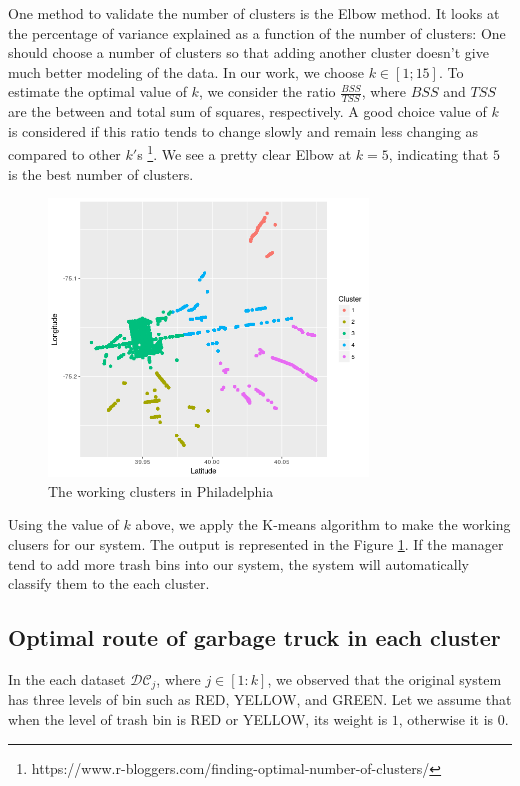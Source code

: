 \documentclass[conference,compsoc]{IEEEtran}
\begin{document}
 One method to validate the number of clusters is the Elbow method. It looks at the percentage of variance explained as a function of the number of clusters: One should choose a number of clusters so that adding another cluster doesn’t give much better modeling of the data. In our work, we choose $k \in [1;15]$. To estimate the optimal value of $k$, we consider the ratio $\frac{BSS}{TSS}$, where $BSS$ and $TSS$ are the between and total sum of squares, respectively. A good choice value of $k$ is considered if this ratio tends to change slowly and remain less changing as compared to other $k'$s \footnote{https://www.r-bloggers.com/finding-optimal-number-of-clusters/}. We see a pretty clear Elbow at $k = 5$, indicating that $5$ is the best number of clusters.
   \begin{figure}
 	\centering
 	\includegraphics[width=8.5cm]{workingcluster}
 	\caption{The working clusters in Philadelphia}
 	\label{fig4}
 \end{figure}
 
 \par Using the value of $k$ above, we apply the K-means algorithm to make the working clusers for our system. The output is represented in the Figure \ref{fig4}. If the manager tend to add more trash bins into our system, the system will automatically classify them to the each cluster. 
 

 
\subsection{Optimal route of garbage truck in each cluster}


In the each dataset $\mathcal{DC}_j$, where $j \in [1:k]$, we observed that the original system has three levels of bin such as RED, YELLOW, and GREEN. Let we assume that when the level of trash bin is RED or YELLOW, its weight is $1$, otherwise it is $0$.
\end{document}
